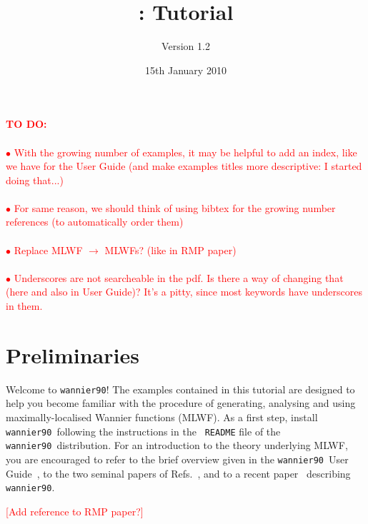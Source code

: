 \documentclass[a4paper,11pt,twoside]{article}
\title{\wannier: Tutorial}
\author{Version 1.2}
\date{15th January 2010}
\def\tent#1{\textcolor{red}{#1}}     %
\begin{document}
\newcommand{\wannier}{{\rm\texttt{wannier90}}}
\newcommand{\postw}{{\rm\texttt{postw90}}}
\newcommand{\bw}{{\rm\texttt{BoltzWann}}}
\newcommand{\pwscf}{\textsc{pwscf}}
\newcommand{\QE}{\textsc{quantum-espresso}}
\newcommand{\Mkb}{\mathbf{M}^{(\mathbf{k},\mathbf{b})}}
\newcommand{\Ak}{\mathbf{A}^{(\mathbf{k})}}
\newcommand{\Uk}{\mathbf{U}^{(\mathbf{k})}}

\maketitle

\tent{
  {\bf TO DO:}\\ \\
  $\bullet$ With the growing number of examples, it may be helpful to add an index, like we have for the User Guide (and make examples titles more descriptive: I started doing that...)\\ \\
  $\bullet$ For same reason, we should think of using bibtex for the growing number references (to automatically order them)\\ \\
  $\bullet$ Replace MLWF $\rightarrow$ MLWFs? (like in RMP paper)\\ \\
  $\bullet$ Underscores are not searcheable in the pdf. Is there a way
  of changing that (here and also in User Guide)? It's a pitty, since
  most keywords have underscores in them. }

\section*{Preliminaries}

Welcome to \wannier! The examples contained in this tutorial are
designed to help you become familiar with the procedure of generating,
analysing and using maximally-localised Wannier functions (MLWF). As a
first step, install \wannier\ following the instructions in the {\tt
  README} file of the \wannier\ distribution.  For an introduction to
the theory underlying MLWF, you are encouraged to refer to the brief
overview given in the \wannier\ User Guide~\cite{UserGuide}, to the
two seminal papers of Refs.~\cite{MV,SMV}, and to a recent
paper~\cite{W90} describing \wannier.

\tent{[Add reference to RMP paper?]}
\end{document}
